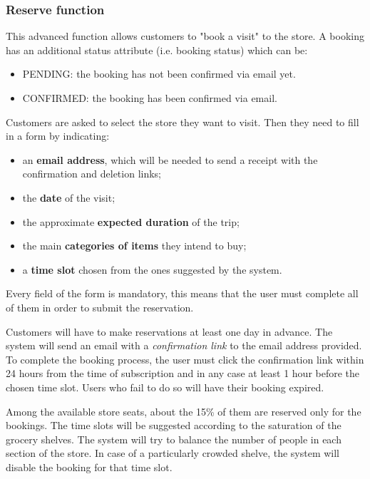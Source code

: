 	\subsubsection{Reserve function}
	This advanced function allows customers to "book a visit" to the store.
	A booking has an additional status attribute (i.e. booking status) which can be:
	\begin{itemize}
		\item PENDING: the booking has not been confirmed via email yet.
		\item CONFIRMED: the booking has been confirmed via email.
	\end{itemize}

	Customers are asked to select the store they want to visit. Then they need to fill in a form by indicating:
	\begin{itemize}
		\item an \textbf{email address}, which will be needed to send a receipt with the confirmation and deletion links;
		\item the \textbf{date} of the visit;
		\item the approximate \textbf{expected duration} of the trip;
	 	\item the main \textbf{categories of items} they intend to buy;
	    \item a \textbf{time slot} chosen from the ones suggested by the system.
	\end{itemize}
	Every field of the form is mandatory, this means that the user must complete all of them in order to submit the reservation.

	Customers will have to make reservations at least one day in advance.\newline
	The system will send an email with a \textit{confirmation link} to the email address provided. To complete the booking process, the user must click the confirmation link within 24 hours from the time of subscription and in any case at least 1 hour before the chosen time slot. Users who fail to do so will have their booking expired.
	
	Among the available store seats, about the 15\% of them are reserved only for the bookings.\newline
	The time slots will be suggested according to the saturation of the grocery shelves.\newline
	The system will try to balance the number of people in each section of the store. In case of a particularly crowded shelve, the system will disable the booking for that time slot.
	
